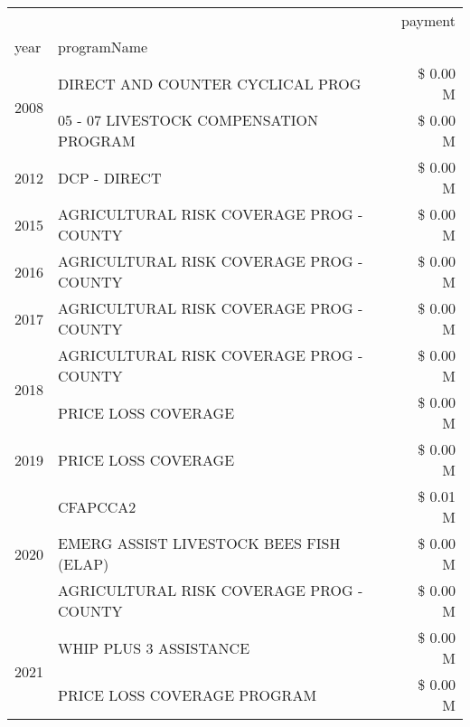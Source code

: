 \begin{tabular}{llr}
\toprule
 &  & payment \\
year & programName &  \\
\midrule
\multirow[t]{2}{*}{2008} & DIRECT AND COUNTER CYCLICAL PROG & \$ 0.00 M \\
 & 05 - 07 LIVESTOCK COMPENSATION PROGRAM & \$ 0.00 M \\
\cline{1-3}
2012 & DCP - DIRECT & \$ 0.00 M \\
\cline{1-3}
2015 & AGRICULTURAL RISK COVERAGE PROG - COUNTY & \$ 0.00 M \\
\cline{1-3}
2016 & AGRICULTURAL RISK COVERAGE PROG - COUNTY & \$ 0.00 M \\
\cline{1-3}
2017 & AGRICULTURAL RISK COVERAGE PROG - COUNTY & \$ 0.00 M \\
\cline{1-3}
\multirow[t]{2}{*}{2018} & AGRICULTURAL RISK COVERAGE PROG - COUNTY & \$ 0.00 M \\
 & PRICE LOSS COVERAGE & \$ 0.00 M \\
\cline{1-3}
2019 & PRICE LOSS COVERAGE & \$ 0.00 M \\
\cline{1-3}
\multirow[t]{3}{*}{2020} & CFAPCCA2 & \$ 0.01 M \\
 & EMERG ASSIST LIVESTOCK BEES FISH (ELAP) & \$ 0.00 M \\
 & AGRICULTURAL RISK COVERAGE PROG - COUNTY & \$ 0.00 M \\
\cline{1-3}
\multirow[t]{2}{*}{2021} & WHIP PLUS 3 ASSISTANCE & \$ 0.00 M \\
 & PRICE LOSS COVERAGE PROGRAM & \$ 0.00 M \\
\cline{1-3}
\bottomrule
\end{tabular}
